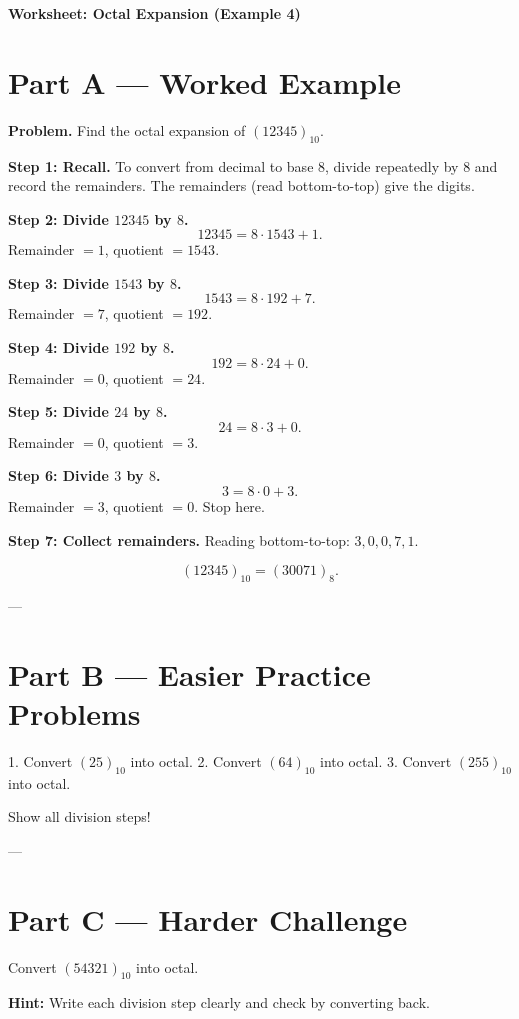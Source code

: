 \documentclass[12pt]{article}
\begin{document}
\begin{center}
\Large\textbf{Worksheet: Octal Expansion (Example 4)}
\end{center}

\section*{Part A — Worked Example}

\textbf{Problem.} Find the octal expansion of $(12345)_{10}$.

\textbf{Step 1: Recall.} To convert from decimal to base $8$, divide repeatedly by $8$ and record the remainders. The remainders (read bottom-to-top) give the digits.

\medskip
\textbf{Step 2: Divide $12345$ by $8$.}
\[
12345 = 8 \cdot 1543 + 1.
\]
Remainder $=1$, quotient $=1543$.

\medskip
\textbf{Step 3: Divide $1543$ by $8$.}
\[
1543 = 8 \cdot 192 + 7.
\]
Remainder $=7$, quotient $=192$.

\medskip
\textbf{Step 4: Divide $192$ by $8$.}
\[
192 = 8 \cdot 24 + 0.
\]
Remainder $=0$, quotient $=24$.

\medskip
\textbf{Step 5: Divide $24$ by $8$.}
\[
24 = 8 \cdot 3 + 0.
\]
Remainder $=0$, quotient $=3$.

\medskip
\textbf{Step 6: Divide $3$ by $8$.}
\[
3 = 8 \cdot 0 + 3.
\]
Remainder $=3$, quotient $=0$. Stop here.

\medskip
\textbf{Step 7: Collect remainders.} Reading bottom-to-top: $3,0,0,7,1$.

\[
(12345)_{10} = (30071)_{8}.
\]


---

\section*{Part B — Easier Practice Problems}
1. Convert $(25)_{10}$ into octal.
2. Convert $(64)_{10}$ into octal.
3. Convert $(255)_{10}$ into octal.

Show all division steps!

---

\section*{Part C — Harder Challenge}
Convert $(54321)_{10}$ into octal.

\textbf{Hint:} Write each division step clearly and check by converting back.
\end{document}
